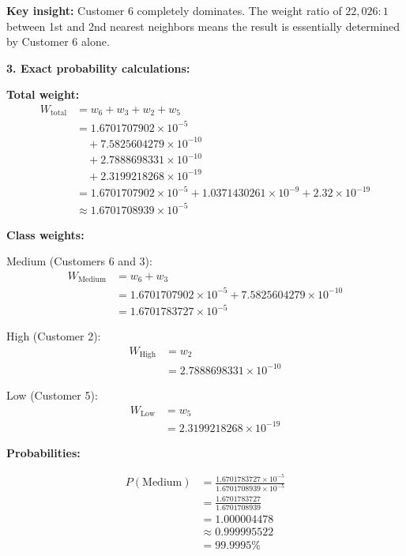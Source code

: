 \documentclass[12pt]{article}
\begin{document}
\begin{computation}
\textbf{Key insight:} Customer 6 completely dominates. The weight ratio of \(22,026:1\) between 1st and 2nd nearest neighbors means the result is essentially determined by Customer 6 alone.

\textbf{3. Exact probability calculations:}

\textbf{Total weight:}
\begin{align*}
W_{\text{total}} &= w_6 + w_3 + w_2 + w_5 \\
&= 1.6701707902 \times 10^{-5} \\
&\quad + 7.5825604279 \times 10^{-10} \\
&\quad + 2.7888698331 \times 10^{-10} \\
&\quad + 2.3199218268 \times 10^{-19} \\
&= 1.6701707902 \times 10^{-5} + 1.0371430261 \times 10^{-9} + 2.32 \times 10^{-19} \\
&\approx 1.6701708939 \times 10^{-5}
\end{align*}

\textbf{Class weights:}

Medium (Customers 6 and 3):
\begin{align*}
W_{\text{Medium}} &= w_6 + w_3 \\
&= 1.6701707902 \times 10^{-5} + 7.5825604279 \times 10^{-10} \\
&= 1.6701783727 \times 10^{-5}
\end{align*}

High (Customer 2):
\begin{align*}
W_{\text{High}} &= w_2 \\
&= 2.7888698331 \times 10^{-10}
\end{align*}

Low (Customer 5):
\begin{align*}
W_{\text{Low}} &= w_5 \\
&= 2.3199218268 \times 10^{-19}
\end{align*}

\textbf{Probabilities:}

\begin{align*}
P(\text{Medium}) &= \frac{1.6701783727 \times 10^{-5}}{1.6701708939 \times 10^{-5}} \\
&= \frac{1.6701783727}{1.6701708939} \\
&= 1.000004478 \\
&\approx 0.999995522 \\
&= \boxed{99.9995\%}
\end{align*}


\end{computation}
\end{document}
